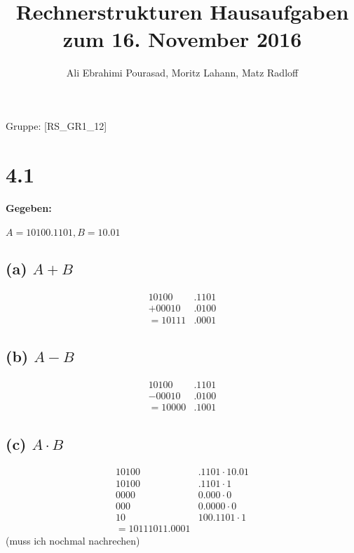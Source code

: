 \documentclass[11pt,a4paper]{article}
\title{\textbf{Rechnerstrukturen Hausaufgaben zum 16. November 2016}}
\author{Ali Ebrahimi Pourasad, Moritz Lahann, Matz Radloff}
\begin{document}
  \maketitle
  \date{}
  Gruppe: [RS\_GR1\_12]

\section*{4.1}
\label {sec:4.1}

\paragraph{Gegeben:} $A = 10100.1101, B = 10.01$

\subsection*{(a) $A+B$}

\begin{align*}
  10100&.1101\\
+ 00010&.0100\\
= 10111&.0001
\end{align*}

\subsection*{(b) $A-B$}

\begin{align*}
  10100&.1101\\
- 00010&.0100\\
= 10000&.1001
\end{align*}

\subsection*{(c) $A \cdot B$}

\begin{align*}
  10100&.1 1 01 \cdot 10.01\\
  10100&.1 1  01 \cdot 1\\
   0000& 0.0  00 \cdot 0\\
    000& 0.0  000 \cdot 0\\
     10& 1 00.1101 \cdot 1\\
=10111011.0001
\end{align*}
(muss ich nochmal nachrechen)
\end{document}

